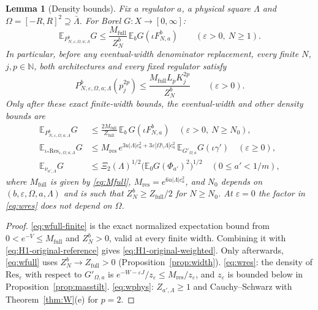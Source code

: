 \documentclass[11pt]{article}
\theoremstyle{plain}
\newtheorem{lemma}[theorem]{Lemma}
\theoremstyle{definition}
\theoremstyle{remark}
\newcommand{\N}{\mathbb{N}}
\newcommand{\E}{\mathbb{E}}
\newcommand{\Res}{\mathrm{Res}}
\begin{document}
\begin{lemma}[Density bounds]\label{lem:weights}
Fix a regulator $a$, a physical square $\Lambda$ and $\Omega=[-R,R]^{2}\supseteq\bar\Lambda$. For
Borel $G:X\to[0,\infty]$:
\begin{equation}\label{eq:wfull-finite}
\E_{P^{b}_{N,\varepsilon,\Omega,a;\Lambda}}G
\le\frac{M_{\mathrm{full}}}{Z_N^b}\,\E_bG(\iota F^b_{N,a})
\qquad(\varepsilon>0,\ N\ge1).
\end{equation}
In particular, before any eventual-width denominator replacement, every
finite $N$, $j,p\in\N$, both architectures and every fixed regulator satisfy
\begin{equation}\label{eq:H1-original-weighted}
 P^b_{N,\varepsilon,\Omega,a;\Lambda}(p_j^{2p})
 \le\frac{M_{\mathrm{full}}L_pK_j^{2p}}{Z_N^b}\qquad(\varepsilon>0).
\end{equation}
Only after these exact finite-width bounds, the eventual-width and other density bounds are
\begin{align}
\E_{P^{b}_{N,\varepsilon,\Omega,a;\Lambda}}G&\le\frac{2M_{\mathrm{full}}}{Z_{\mathrm{full}}}\,\E_b\,G(\iota F^{b}_{N,a})
\quad(\varepsilon>0,\ N\ge N_0),\label{eq:wfull}\\
\E_{\iota_*\Res_{\varepsilon,\Omega,a;\Lambda}}G&\le M_{\mathrm{res}}\,e^{3u|\Lambda|c_a^{2}+3\varepsilon|\Omega\setminus\Lambda|c_a^{2}}\,
\E_{G'_{\Omega,a}}G(\iota\gamma')\quad(\varepsilon\ge0),\label{eq:wres}\\
\E_{\nu_{a',\Lambda}}G&\le\Xi_2(\Lambda)^{1/2}\bigl(\E_0G(\Phi_{a'})^{2}\bigr)^{1/2}\quad(0\le a'<1/m),\label{eq:wphys}
\end{align}
where $M_{\mathrm{full}}$ is given by \eqref{eq:Mfull}, $M_{\mathrm{res}}=e^{6u|\Lambda|c_a^{2}}$, and
$N_0$ depends on $(b,\varepsilon,\Omega,a,\Lambda)$ and is such that $Z^{b}_{N}\ge Z_{\mathrm{full}}/2$ for
$N\ge N_0$. At $\varepsilon=0$ the factor in \eqref{eq:wres} does not depend on $\Omega$.
\end{lemma}

\begin{proof}
\eqref{eq:wfull-finite} is the exact normalized expectation bound from
$0<e^{-V}\le M_{\mathrm{full}}$ and $Z_N^b>0$, valid at every finite width.
Combining it with \eqref{eq:H1-original-reference} gives
\eqref{eq:H1-original-weighted}. Only afterwards, \eqref{eq:wfull} uses
$Z^{b}_{N}\to Z_{\mathrm{full}}>0$
(Proposition~\ref{prop:width}). \eqref{eq:wres}: the density of $\Res_\varepsilon$ with respect to
$G'_{\Omega,a}$ is $e^{-W-\varepsilon J}/z_\varepsilon\le M_{\mathrm{res}}/z_\varepsilon$, and $z_\varepsilon$ is bounded below
in Proposition~\ref{prop:masstilt}. \eqref{eq:wphys}: $Z_{a',\Lambda}\ge1$ and
Cauchy--Schwarz with Theorem~\ref{thm:W}(e) for $p=2$.
\end{proof}
\end{document}
